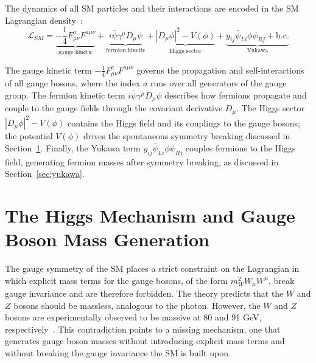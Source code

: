 The dynamics of all SM particles and their interactions are encoded in the SM Lagrangian density~\cite{PDG2022}:
\begin{equation}
  \mathcal{L}_{SM} =
  \underbrace{-\frac{1}{4}F^{a}_{\mu\nu}F^{a\mu\nu}}_{\text{gauge kinetic}}
  + \underbrace{i\bar{\psi} \gamma^\mu D_\mu \psi}_{\text{fermion kinetic}}
  + \underbrace{|D_\mu\phi|^2 - V(\phi)}_{\text{Higgs sector}}
  + \underbrace{y_{ij}\bar{\psi}_{Li}\phi\psi_{Rj} + \text{h.c.}}_{\text{Yukawa}}
  \label{eq:SMlagrangian}
\end{equation}

The gauge kinetic term $-\frac{1}{4}F^a_{\mu\nu}F^{a\mu\nu}$ governs the propagation and self-interactions of all gauge bosons, where the index $a$ runs over all generators of the gauge group. 
The fermion kinetic term $i\bar{\psi}\gamma^\mu D_\mu\psi$ describes how fermions propagate and couple to the gauge fields through the covariant derivative $D_\mu$. 
The Higgs sector $|D_\mu\phi|^2 - V(\phi)$ contains the Higgs field and its couplings to the gauge bosons; the potential $V(\phi)$ drives the spontaneous symmetry breaking discussed in Section~\ref{sec:higgs_mechanism}. 
Finally, the Yukawa term $y_{ij}\bar{\psi}_{Li}\phi\psi_{Rj}$ couples fermions to the Higgs field, generating fermion masses after symmetry breaking, as discussed in Section~\ref{sec:yukawa}.


\section{The Higgs Mechanism and Gauge Boson Mass Generation}
\label{sec:higgs_mechanism}
The gauge symmetry of the SM places a strict constraint on the Lagrangian in which explicit mass terms for the gauge bosons, of the form $m_W^2 W_\mu W^\mu$, break gauge invariance and are therefore forbidden. 
The theory predicts that the $W$ and $Z$ bosons should be massless, analogous to the photon.
However, the $W$ and $Z$ bosons are experimentally observed to be massive at 80 and 91 GeV, respectively~\cite{PDG2022}.
This contradiction points to a missing mechanism, one that generates gauge boson masses without introducing explicit mass terms and without breaking the gauge invariance the SM is built upon.

